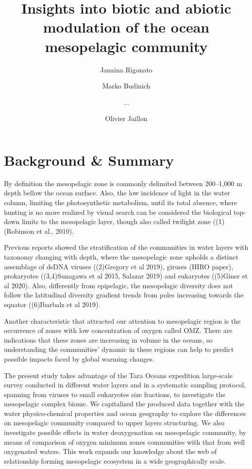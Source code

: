 \documentclass[fleqn,10pt]{wlscirep}
\title{Insights into biotic and abiotic modulation of the ocean mesopelagic community}
\author[1,$\dag$]{Janaina Rigonato}
\author[2,$\dag$]{Marko Budinich}
\author[1,2]{...}
\author[1,*]{Olivier Jaillon}
\affil[1]{Genoscope, department, city, postcode, country}
\affil[2]{GO-SEE, department, Roscoff, postcode, country}
\affil[*]{corresponding author(s): Olivier Jaillon (corresponding.author@email.example)}
\affil[$\dag$]{these authors contributed equally to this work}
\begin{document}
\flushbottom
\maketitle

\thispagestyle{empty}



\section*{Background \& Summary}

By definition the mesopelagic zone is commonly delimited between 200–1,000 m depth bellow the ocean surface. Also, the low incidence of light in the water column, limiting the photosynthetic metabolism, until its total absence, where hunting is no more realized by visual search can be considered the biological top-down limits to the mesopelagic layer, though also called twilight zone ((1)(Robinson et al., 2010).

Previous reports showed the stratification of the communities in water layers with taxonomy changing with depth, where the mesopelagic zone upholds a distinct assemblage  of dsDNA viruses ((2)Gregory et al 2019), giruses (HIRO paper), prokaryotes ((3,4)Sunagawa et al 2015, Salazar 2019) and eukaryotes ((5)Giner et al 2020). Also, differently from epipelagic, the mesopelagic diversity does not follow the latitudinal diversity gradient trends from poles increasing towards the equator ((6)Ibarbalz et al 2019).

Another characteristic that attracted our attention to mesopelagic region is the occurrence of zones with low concentration of oxygen called OMZ. There are indications that these zones are increasing in volume in the oceans, so understanding the communities’ dynamic in these regions can help to predict possible impacts faced by global warming changes.

The present study takes advantage of the Tara Oceans expedition large-scale survey conducted in different water layers and in a systematic sampling protocol, spanning from viruses to small eukaryotes size fractions, to investigate the mesopelagic complex biome. We capitalized the produced data together with the water physico-chemical properties and ocean geography to explore the differences on mesopelagic community compared to upper layers structuring. We also investigate possible effects in water deoxygenation on mesopelagic community, by means of comparison of oxygen minimum zones communities with that from well oxygenated waters. This work expands our knowledge about the web of relationship forming mesopelagic ecosystem in a wide geographically scale.
\end{document}
